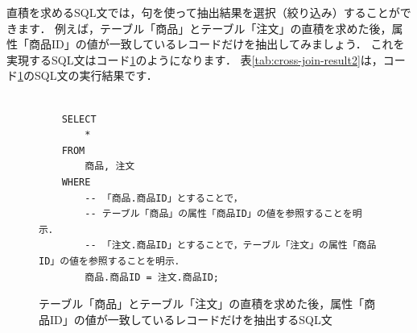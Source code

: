 直積を求めるSQL文では，句を使って抽出結果を選択（絞り込み）することができます．
例えば，テーブル「商品」とテーブル「注文」の直積を求めた後，属性「商品ID」の値が一致しているレコードだけを抽出してみましょう．
これを実現するSQL文はコード\ref{code:sql-cross-join4}のようになります．
表\ref{tab:cross-join-result2}は，コード\ref{code:sql-cross-join4}のSQL文の実行結果です．
\begin{figure}[!htbp]
    \begin{verbatim}

    SELECT
        *
    FROM
        商品, 注文
    WHERE
        -- 「商品.商品ID」とすることで，
        -- テーブル「商品」の属性「商品ID」の値を参照することを明示．
        -- 「注文.商品ID」とすることで，テーブル「注文」の属性「商品ID」の値を参照することを明示．
        商品.商品ID = 注文.商品ID;

    \end{verbatim}
    \captionsetup{name=コード}
    \caption{テーブル「商品」とテーブル「注文」の直積を求めた後，属性「商品ID」の値が一致しているレコードだけを抽出するSQL文}
    \label{code:sql-cross-join4}
\end{figure}
\begin{table}[!htbp]
    \centering
    \caption{テーブル「商品」とテーブル「注文」の直積を求めた後，属性「商品ID」の値が一致しているレコードだけを抽出するSQL文の実行結果}
    \label{tab:cross-join-result2}
\end{table}


